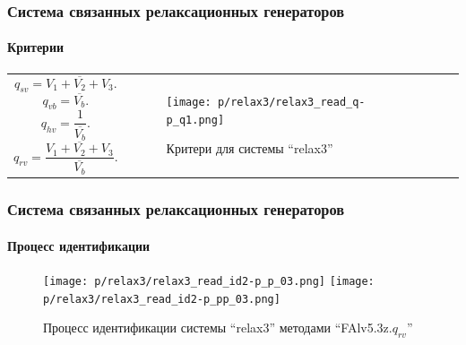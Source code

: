 \documentclass[10pt,utf8]{beamer}
\newlength\TW
\begin{document}
\begin{frame}
  \frametitle{Система связанных релаксационных генераторов}
  \framesubtitle{Критерии}

  \begin{tabular}{p{40\TW}|p{57\TW}}
    \[
      q_{sv} = \overline{V_1+V_2+V_3} .
    \]
    \[
      q_{vb} = \overline{V_b} .
    \]
    \[
      q_{hv} = \frac{1}{\overline{V_b}} .
    \]
    \[
      q_{rv} = \frac{\overline{V_1+V_2+V_3}}{\overline{V_b}}.
    \]
 &
  \begin{figure}[htb!]
    \centerline{\texttt{[image: p/relax3/relax3\_read\_q-p\_q1.png]} }
    \caption{Критери для системы ``relax3''}
    \label{atu:f:relax3_q}
  \end{figure}
  \end{tabular}

\end{frame}




\begin{frame}
  \frametitle{Система связанных релаксационных генераторов}
  \framesubtitle{Процесс идентификации}

  \begin{figure}[ht!]
    \centerline{
      \texttt{[image: p/relax3/relax3\_read\_id2-p\_p\_03.png]}
      \texttt{[image: p/relax3/relax3\_read\_id2-p\_pp\_03.png]}
      \hfill
    }
    \caption{Процесс идентификации системы ``relax3'' методами ``FAlv5.3z.$q_{rv}$'' }
    \label{atu:f:relax3_id0}
  \end{figure}

\end{frame}



\end{document}
